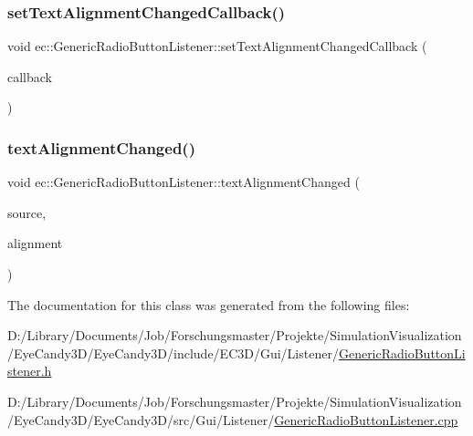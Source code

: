 \mbox{\label{classec_1_1_generic_radio_button_listener_a90c75e6db58773ab30347174e40d33ae}} 
\subsubsection{\texorpdfstring{set\+Text\+Alignment\+Changed\+Callback()}{setTextAlignmentChangedCallback()}}
{\footnotesize\ttfamily void ec\+::\+Generic\+Radio\+Button\+Listener\+::set\+Text\+Alignment\+Changed\+Callback (\begin{DoxyParamCaption}\item[{const \mbox{\hyperlink{classec_1_1_generic_radio_button_listener_a3e8ead6a08363f220625d2f856b9213d}{Text\+Alignment\+Changed\+\_\+\+Callback}} \&}]{callback }\end{DoxyParamCaption})}

\mbox{\label{classec_1_1_generic_radio_button_listener_a324705c5155f71e01104399b12a95b8f}} 
\subsubsection{\texorpdfstring{text\+Alignment\+Changed()}{textAlignmentChanged()}}
{\footnotesize\ttfamily void ec\+::\+Generic\+Radio\+Button\+Listener\+::text\+Alignment\+Changed (\begin{DoxyParamCaption}\item[{agui\+::\+Radio\+Button $\ast$}]{source,  }\item[{agui\+::\+Area\+Alignment\+Enum}]{alignment }\end{DoxyParamCaption})\hspace{0.3cm}{\ttfamily [override]}}



The documentation for this class was generated from the following files\+:\begin{DoxyCompactItemize}
\item 
D\+:/\+Library/\+Documents/\+Job/\+Forschungsmaster/\+Projekte/\+Simulation\+Visualization/\+Eye\+Candy3\+D/\+Eye\+Candy3\+D/include/\+E\+C3\+D/\+Gui/\+Listener/\mbox{\hyperlink{_generic_radio_button_listener_8h}{Generic\+Radio\+Button\+Listener.\+h}}\item 
D\+:/\+Library/\+Documents/\+Job/\+Forschungsmaster/\+Projekte/\+Simulation\+Visualization/\+Eye\+Candy3\+D/\+Eye\+Candy3\+D/src/\+Gui/\+Listener/\mbox{\hyperlink{_generic_radio_button_listener_8cpp}{Generic\+Radio\+Button\+Listener.\+cpp}}\end{DoxyCompactItemize}
